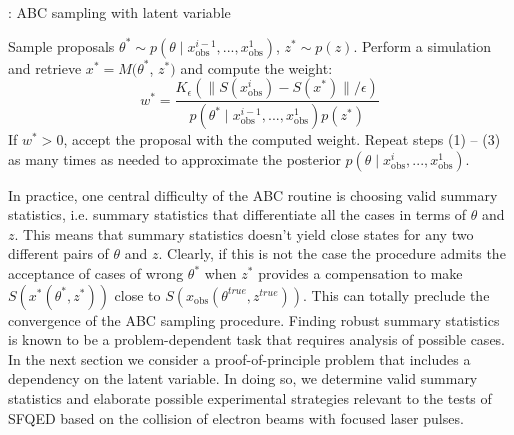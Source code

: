 \documentclass[%
 reprint,
 amsmath,amssymb,
 aps,
]{revtex4-2}
\begin{document}
\begin{algorithm}[H]
\begin{algorithmic}[1]
\caption{: ABC sampling with latent variable}\label{alg:ABCsampling} 
\State Sample proposals $\theta^* \sim p\left(\theta \mid x^{i-1}_\text{obs}, ..., x^1_\text{obs}\right)$, $z^* \sim p(z)$.
\State Perform a simulation and retrieve $x^* = M(\theta^*$, $z^*)$ and compute the weight:
\begin{equation}
w^* = \frac{K_\epsilon\left(\| S(x^i_\text{obs}) - S(x^*)\|/\epsilon\right)}{p\left(\theta^* \mid x^{i-1}_\text{obs}, ..., x^1_\text{obs}\right) p(z^*)}
\end{equation}
\State If $w^* > 0$, accept the proposal with the computed weight. 
\State Repeat steps (1) -- (3) as many times as needed to approximate the posterior $p\left(\theta \mid x^i_\text{obs}, ..., x^1_\text{obs}\right)$.
\end{algorithmic}
\end{algorithm}
In practice, one central difficulty of the ABC routine is choosing valid summary statistics, i.e. summary statistics that differentiate all the cases in terms of $\theta$ and $z$. This means that summary statistics doesn't yield close states for any two different pairs of $\theta$ and $z$. Clearly, if this is not the case the procedure admits the acceptance of cases of wrong $\theta^*$ when $z^*$ provides a compensation to make $S(x^*(\theta^*, z^*))$ close to $S(x_\text{obs}(\theta^{true}, z^{true}))$. This can totally preclude the convergence of the ABC sampling procedure. Finding robust summary statistics is known to be a problem-dependent task that requires analysis of possible cases. In the next section we consider a proof-of-principle problem that includes a dependency on the latent variable. In doing so, we determine valid summary statistics and elaborate possible experimental strategies relevant to the tests of SFQED based on the collision of electron beams with focused laser pulses.
\end{document}
